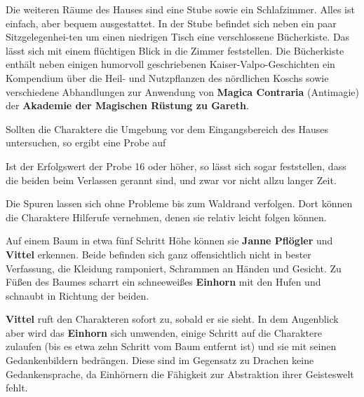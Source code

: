 Die weiteren Räume des Hauses sind eine Stube sowie ein Schlafzimmer. Alles ist einfach, aber bequem ausgestattet. In der Stube befindet sich neben ein paar Sitzgelegenhei-ten um einen niedrigen Tisch eine verschlossene Bücherkiste. Das lässt sich mit einem flüchtigen Blick in die Zimmer feststellen. Die Bücherkiste enthält neben einigen humorvoll geschriebenen Kaiser-Valpo-Geschichten ein Kompendium über die Heil- und Nutzpflanzen des nördlichen Koschs sowie verschiedene Abhandlungen zur Anwendung von \textbf{Magica Contraria} (Antimagie) der \textbf{Akademie der Magischen Rüstung zu Gareth}.

Sollten die Charaktere die Umgebung vor dem Eingangsbereich des Hauses untersuchen, so ergibt eine Probe auf 

Ist der Erfolgswert der Probe 16 oder höher, so lässt sich sogar feststellen, dass die beiden beim Verlassen gerannt sind, und zwar vor nicht allzu langer Zeit.

Die Spuren lassen sich ohne Probleme bis zum Waldrand verfolgen. Dort können die Charaktere Hilferufe vernehmen, denen sie relativ leicht folgen können.
\begin{center}
\end{center}

Auf einem Baum in etwa fünf Schritt Höhe können sie \textbf{Janne Pflögler} und \textbf{Vittel} erkennen.
	Beide befinden sich ganz offensichtlich nicht in bester Verfassung, die Kleidung ramponiert, Schrammen an Händen und Gesicht.
	Zu Füßen des Baumes scharrt ein schneeweißes \textbf{Einhorn} mit den Hufen und schnaubt in Richtung der beiden.
	
	\textbf{Vittel} ruft den Charakteren sofort zu, sobald er sie sieht.
	In dem Augenblick aber wird das \textbf{Einhorn} sich umwenden, einige Schritt auf die Charaktere zulaufen (bis es etwa zehn Schritt vom Baum entfernt ist) und sie mit seinen Gedankenbildern bedrängen.
	Diese sind im Gegensatz zu Drachen keine Gedankensprache, da Einhörnern die Fähigkeit zur Abstraktion ihrer Geisteswelt fehlt.
 




